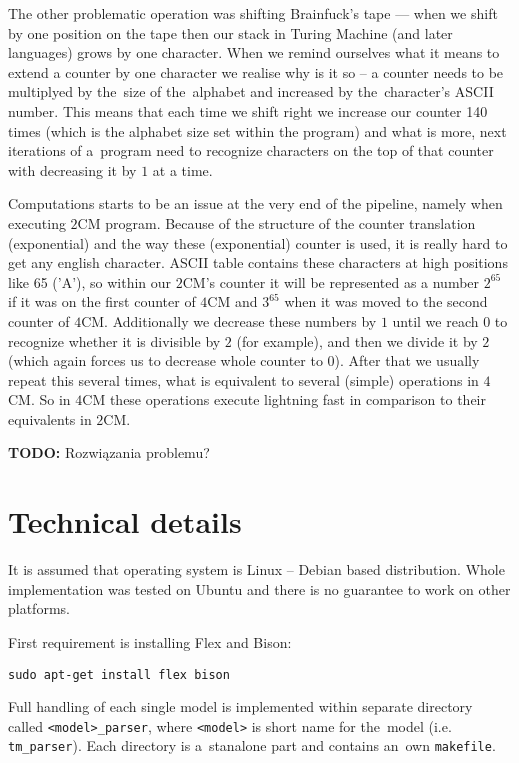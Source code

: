 \documentclass[english,shortabstract,mgr]{iithesis}
\newcommand{\todo}[1]{\textbf{TODO:} #1}
\begin{document}
The other problematic operation was shifting Brainfuck's tape --- when we shift
by one position on the tape then our stack in Turing Machine (and later languages)
grows by one character. When we remind ourselves what it means to extend a counter by
one character we realise why is it so -- a counter needs to be multiplyed by
the~size of the~alphabet and increased by the~character's ASCII number.
This means that each time we shift right we increase our counter 140 times
(which is the alphabet size set within the program) and what is more, next
iterations of a~program need to recognize characters on the top of that
counter with decreasing it by $1$ at a time.

Computations starts to be an issue at the very end of the pipeline, namely
when executing $2$CM program. Because of the structure of the counter translation
(exponential) and the way these (exponential) counter is used, it is really
hard to get any english character. ASCII table contains these characters
at high positions like 65 ('A'), so within our $2$CM's counter it will be represented
as a number $2^{65}$ if it was on the first counter of $4$CM and $3^{65}$ when
it was moved to the second counter of $4$CM. Additionally we decrease these numbers
by $1$ until we reach $0$ to recognize whether it is divisible by $2$ (for example),
and then we divide it by $2$ (which again forces us to decrease whole counter to $0$).
After that we usually repeat this several times, what is equivalent to several
(simple) operations in $4$CM. So in $4$CM these operations execute lightning fast
in comparison to their equivalents in $2$CM.

\todo{Rozwiązania problemu?}

\section{Technical details}

It is assumed that operating system is Linux -- Debian based distribution. Whole implementation
was tested on Ubuntu and there is no guarantee to work on other platforms.

First requirement is installing Flex and Bison:

\texttt{sudo apt-get install flex bison}

Full handling of each single model is implemented within separate directory called
\texttt{<model>\_parser}, where \texttt{<model>} is short name for the~model
(i.e. \texttt{tm\_parser}). Each directory is a~stanalone part and contains
an~own \texttt{makefile}.
\end{document}
